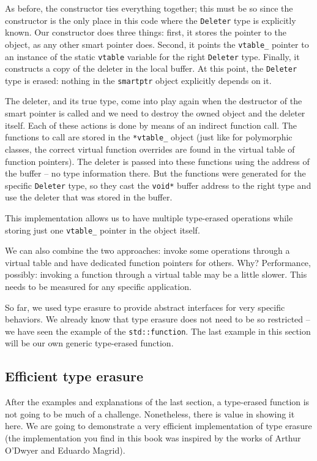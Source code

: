 As before, the constructor ties everything together; this must be so since the constructor is the only place in this code where the \texttt{Deleter} type is explicitly known. Our constructor does three things: first, it stores the pointer to the object, as any other smart pointer does. Second, it points the \texttt{vtable\_} pointer to an instance of the static \texttt{vtable} variable for the right \texttt{Deleter} type. Finally, it constructs a copy of the deleter in the local buffer. At this point, the \texttt{Deleter} type is erased: nothing in the \texttt{smartptr} object explicitly depends on it.

The deleter, and its true type, come into play again when the destructor of the smart pointer is called and we need to destroy the owned object and the deleter itself. Each of these actions is done by means of an indirect function call. The functions to call are stored in the \texttt{*vtable\_} object (just like for polymorphic classes, the correct virtual function overrides are found in the virtual table of function pointers). The deleter is passed into these functions using the address of the buffer -- no type information there. But the functions were generated for the specific \texttt{Deleter} type, so they cast the \texttt{void*} buffer address to the right type and use the deleter that was stored in the buffer.

This implementation allows us to have multiple type-erased operations while storing just one \texttt{vtable\_} pointer in the object itself.

We can also combine the two approaches: invoke some operations through a virtual table and have dedicated function pointers for others. Why? Performance, possibly: invoking a function through a virtual table may be a little slower. This needs to be measured for any specific application.

So far, we used type erasure to provide abstract interfaces for very specific behaviors. We already know that type erasure does not need to be so restricted -- we have seen the example of the \texttt{std::function}. The last example in this section will be our own generic type-erased function.

\subsection{Efficient type erasure}

After the examples and explanations of the last section, a type-erased function is not going to be much of a challenge. Nonetheless, there is value in showing it here. We are going to demonstrate a very efficient implementation of type erasure (the implementation you find in this book was inspired by the works of Arthur O'Dwyer and Eduardo Magrid).

